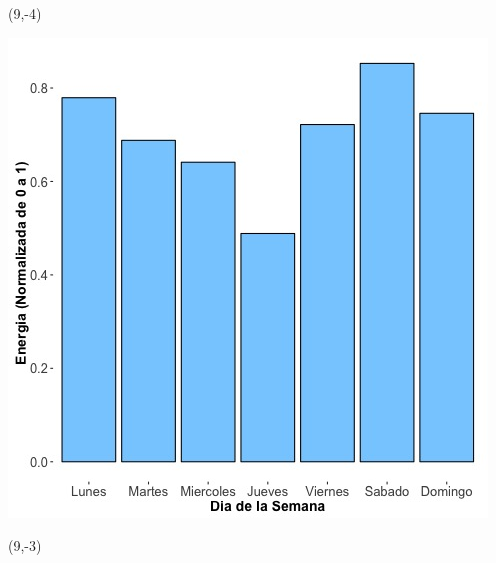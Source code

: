 \documentclass{article}\usepackage[]{graphicx}\usepackage[]{color}
\newenvironment{knitrout}{}{} %
\begin{document}
 \begin{textblock}{1}(9,-4)
\begin{minipage}{20em}
\begingroup

\endgroup
\end{minipage}
\end{textblock}


\begin{knitrout}
\color{fgcolor}
\includegraphics[scale=0.65]{figure/A17_day_of_week_plot} 
\end{knitrout}


 \begin{textblock}{1}(9,-3)
\begin{minipage}{20em}
\begingroup

\endgroup
\end{minipage}
\end{textblock}
\end{document}
